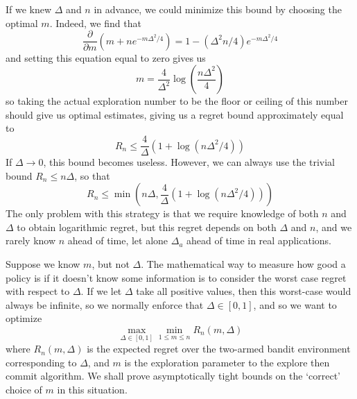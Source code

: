 If we knew $\Delta$ and $n$ in advance, we could minimize this bound by choosing the optimal $m$. Indeed, we find that
%
\[ \frac{\partial}{\partial m}(m + n e^{-m \Delta^2/4}) = 1 - (\Delta^2 n/4) e^{-m \Delta^2/4} \]
%
and setting this equation equal to zero gives us
%
\[ m = \frac{4}{\Delta^2} \log \left(\frac{n \Delta^2}{4} \right) \]
%
so taking the actual exploration number to be the floor or ceiling of this number should give us optimal estimates, giving us a regret bound approximately equal to
%
\[ R_n \leq \frac{4}{\Delta} (1 + \log(n\Delta^2/4)) \]
%
If $\Delta \to 0$, this bound becomes useless. However, we can always use the trivial bound $R_n \leq n \Delta$, so that
%
\[ R_n \leq \min \left( n \Delta, \frac{4}{\Delta} (1 + \log(n \Delta^2/4)) \right) \]
%
The only problem with this strategy is that we require knowledge of both $n$ and $\Delta$ to obtain logarithmic regret, but this regret depends on both $\Delta$ and $n$, and we rarely know $n$ ahead of time, let alone $\Delta_a$ ahead of time in real applications.

Suppose we know $m$, but not $\Delta$. The mathematical way to measure how good a policy is if it doesn't know some information is to consider the worst case regret with respect to $\Delta$. If we let $\Delta$ take all positive values, then this worst-case would always be infinite, so we normally enforce that $\Delta \in [0,1]$, and so we want to optimize
%
\[ \max_{\Delta \in [0,1]} \min_{1 \leq m \leq n} R_n(m, \Delta) \]
%
where $R_n(m, \Delta)$ is the expected regret over the two-armed bandit environment corresponding to $\Delta$, and $m$ is the exploration parameter to the explore then commit algorithm. We shall prove asymptotically tight bounds on the `correct' choice of $m$ in this situation.

